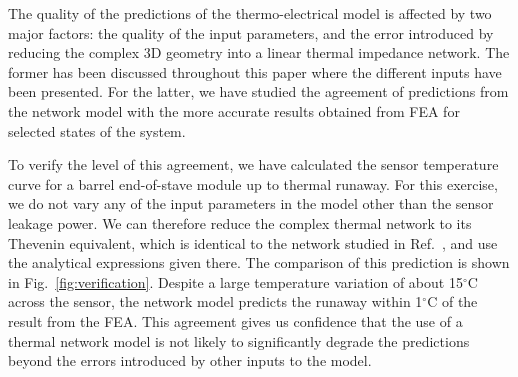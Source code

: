 The quality of the predictions of the thermo-electrical model is affected by two major factors: the quality of the input parameters, and the error introduced by reducing the complex 3D geometry into a linear thermal impedance network. The former has been discussed throughout this paper where the different inputs have been presented. For the latter, we have studied the agreement of predictions from the network model with the more accurate results obtained from FEA for selected states of the system.

To verify the level of this agreement, we have calculated the sensor temperature curve for a barrel end-of-stave module up to thermal runaway. For this exercise, we do not vary any of the input parameters in the model other than the sensor leakage power. We can therefore reduce the complex thermal network to its Thevenin equivalent, which is identical to the network studied in Ref.~\cite{Beck:2010zzd}, and use the analytical expressions given there. The comparison of this prediction is shown in Fig.~\ref{fig:verification}. Despite a large temperature variation of about 15$^\circ$C across the sensor, 
the network model predicts the runaway within 1$^\circ$C of the result from the FEA. This agreement gives us confidence that the use of a thermal network model is not likely to significantly degrade the predictions beyond the errors introduced by other inputs to the model. 

